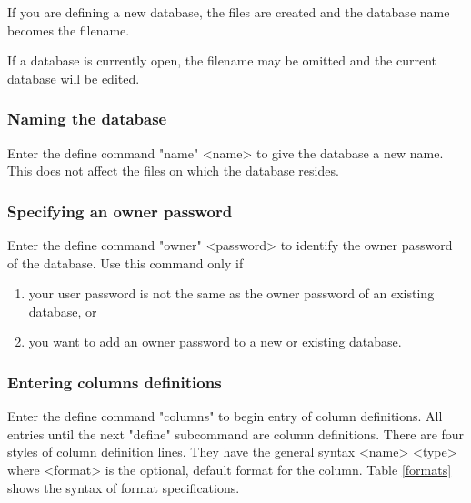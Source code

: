 If you are defining a new database, the files are created
and the database name becomes the filename.
 
If a database is currently open, the filename may be omitted
and the current database will be edited.
 
\subsubsection{Naming the database}
%
Enter the define command
\<"name" <name>\>
to give the database a new name.  This does not affect the
files on which the database resides.
 
 
\subsubsection{Specifying an owner password}
%
Enter the define command
\<"owner" <password>\>
to identify the owner password of the database.
Use this command only if
 
\begin{enumerate}
\item your user password is not the same as the owner password
   of an existing database, or
\item you want to add an owner password to a new or existing
   database.
\end{enumerate}
 
\subsubsection{Entering columns definitions}
%
Enter the define command
\<"columns"\>
to begin entry of column definitions.
All entries until the next "define" subcommand
are column definitions.
There are four styles of column definition lines.
They have the general syntax
\<<name> <type>  \>
where <format> is the optional, default format for the column.
Table \ref{formats} shows the syntax of format specifications.
 
